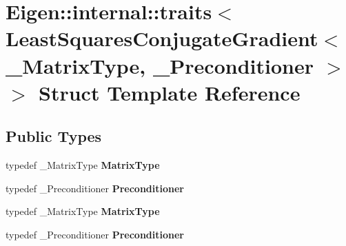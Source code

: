 \hypertarget{struct_eigen_1_1internal_1_1traits_3_01_least_squares_conjugate_gradient_3_01___matrix_type_00_01___preconditioner_01_4_01_4}{}\section{Eigen\+:\+:internal\+:\+:traits$<$ Least\+Squares\+Conjugate\+Gradient$<$ \+\_\+\+Matrix\+Type, \+\_\+\+Preconditioner $>$ $>$ Struct Template Reference}
\label{struct_eigen_1_1internal_1_1traits_3_01_least_squares_conjugate_gradient_3_01___matrix_type_00_01___preconditioner_01_4_01_4}
\subsection*{Public Types}
\begin{DoxyCompactItemize}
\item 
\mbox{\label{struct_eigen_1_1internal_1_1traits_3_01_least_squares_conjugate_gradient_3_01___matrix_type_00_01___preconditioner_01_4_01_4_a3d4afaf55e0afb29f11774075ba3345c}} 
typedef \+\_\+\+Matrix\+Type {\bfseries Matrix\+Type}
\item 
\mbox{\label{struct_eigen_1_1internal_1_1traits_3_01_least_squares_conjugate_gradient_3_01___matrix_type_00_01___preconditioner_01_4_01_4_a0e72eaaca694d18095ebf0edf113b465}} 
typedef \+\_\+\+Preconditioner {\bfseries Preconditioner}
\item 
\mbox{\label{struct_eigen_1_1internal_1_1traits_3_01_least_squares_conjugate_gradient_3_01___matrix_type_00_01___preconditioner_01_4_01_4_a3d4afaf55e0afb29f11774075ba3345c}} 
typedef \+\_\+\+Matrix\+Type {\bfseries Matrix\+Type}
\item 
\mbox{\label{struct_eigen_1_1internal_1_1traits_3_01_least_squares_conjugate_gradient_3_01___matrix_type_00_01___preconditioner_01_4_01_4_a0e72eaaca694d18095ebf0edf113b465}} 
typedef \+\_\+\+Preconditioner {\bfseries Preconditioner}
\end{DoxyCompactItemize}


